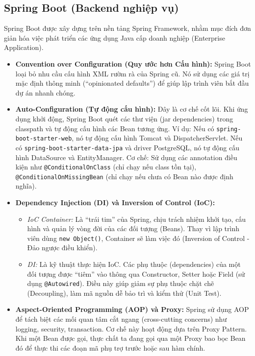 \documentclass[12pt,a4paper]{report}
\begin{document}
\subsection{Spring Boot (Backend nghiệp vụ)}
Spring Boot được xây dựng trên nền tảng Spring Framework, nhằm mục đích đơn giản hóa việc phát triển các ứng dụng Java cấp doanh nghiệp (Enterprise Application).
\begin{itemize}
    \item \textbf{Convention over Configuration (Quy ước hơn Cấu hình):} Spring Boot loại bỏ nhu cầu cấu hình XML rườm rà của Spring cũ. Nó sử dụng các giá trị mặc định thông minh (``opinionated defaults'') để giúp lập trình viên bắt đầu dự án nhanh chóng.
    \item \textbf{Auto-Configuration (Tự động cấu hình):} Đây là cơ chế cốt lõi. Khi ứng dụng khởi động, Spring Boot quét các thư viện (jar dependencies) trong classpath và tự động cấu hình các Bean tương ứng. Ví dụ: Nếu có \texttt{spring-boot-starter-web}, nó tự động cấu hình Tomcat và DispatcherServlet. Nếu có \texttt{spring-boot-starter-data-jpa} và driver PostgreSQL, nó tự động cấu hình DataSource và EntityManager. Cơ chế: Sử dụng các annotation điều kiện như \texttt{@ConditionalOnClass} (chỉ chạy nếu class tồn tại), \texttt{@ConditionalOnMissingBean} (chỉ chạy nếu chưa có Bean nào được định nghĩa).
    \item \textbf{Dependency Injection (DI) và Inversion of Control (IoC):}
    \begin{itemize}
        \item \textit{IoC Container:} Là ``trái tim'' của Spring, chịu trách nhiệm khởi tạo, cấu hình và quản lý vòng đời của các đối tượng (Beans). Thay vì lập trình viên dùng \texttt{new Object()}, Container sẽ làm việc đó (Inversion of Control - Đảo ngược điều khiển).
        \item \textit{DI:} Là kỹ thuật thực hiện IoC. Các phụ thuộc (dependencies) của một đối tượng được ``tiêm'' vào thông qua Constructor, Setter hoặc Field (sử dụng \texttt{@Autowired}). Điều này giúp giảm sự phụ thuộc chặt chẽ (Decoupling), làm mã nguồn dễ bảo trì và kiểm thử (Unit Test).
    \end{itemize}
    \item \textbf{Aspect-Oriented Programming (AOP) và Proxy:} Spring sử dụng AOP để tách biệt các mối quan tâm cắt ngang (cross-cutting concerns) như logging, security, transaction. Cơ chế này hoạt động dựa trên Proxy Pattern. Khi một Bean được gọi, thực chất ta đang gọi qua một Proxy bao bọc Bean đó để thực thi các đoạn mã phụ trợ trước hoặc sau hàm chính.
\end{itemize}
\end{document}
